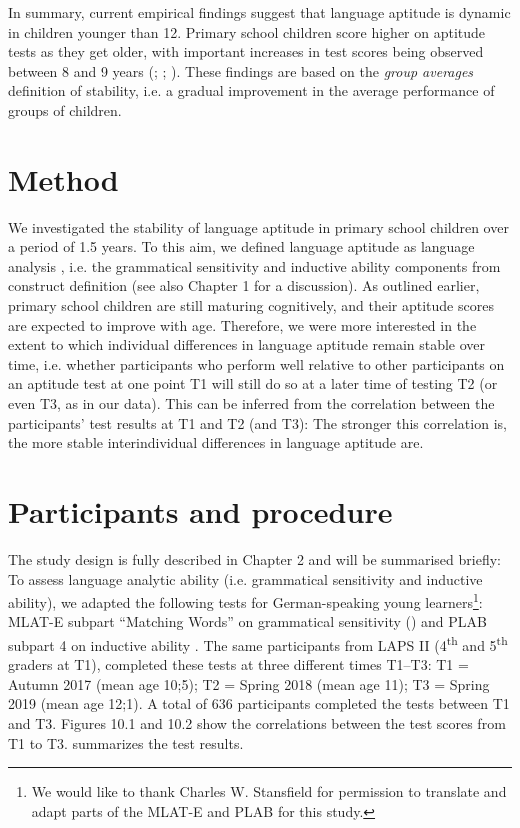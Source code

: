 \documentclass[output=paper]{langsci/langscibook}
\begin{document}
In summary, current empirical findings suggest that language aptitude is dynamic in children younger than 12. Primary school children score higher on aptitude tests as they get older, with important increases in test scores being observed between 8 and 9 years (\citealt{MiltonAlexiou2006}; \citealt{Kiss2009}; \citealt{SuarezMunoz2011}). These findings are based on the \textit{group averages} definition of stability, i.e. a gradual improvement in the average performance of groups of children. 

\section{Method}

We investigated the stability of language aptitude in primary school children over a period of 1.5 years. To this aim, we defined language aptitude as language analysis \citep{Skehan1998}, i.e. the grammatical sensitivity and inductive ability components from  construct definition (see also Chapter 1 for a discussion). As outlined earlier, primary school children are still maturing cognitively, and their aptitude scores are expected to improve with age. Therefore, we were more interested in the extent to which individual differences in language aptitude remain stable over time, i.e. whether participants who perform well relative to other participants on an aptitude test at one point T1 will still do so at a later time of testing T2 (or even T3, as in our data). This can be inferred from the correlation between the participants’ test results at T1 and T2 (and T3): The stronger this correlation is, the more stable interindividual differences in language aptitude are. 

 \section{Participants and procedure}


The study design is fully described in Chapter 2 and will be summarised briefly: To assess language analytic ability (i.e. grammatical sensitivity and inductive ability), we adapted the following tests for German-speaking young learners\footnote{We would like to thank Charles W. Stansfield for permission to translate and adapt parts of the MLAT-E and PLAB for this study.}: MLAT-E subpart “Matching Words” on grammatical sensitivity (\citealt{CarrollSapon1976}) and PLAB subpart 4 on inductive ability \citep{PimsleurEtAl2004}. The same participants from LAPS II (4\textsuperscript{th} and 5\textsuperscript{th} graders at T1), completed these tests at three different times T1--T3: T1 = Autumn 2017 (mean age 10;5); T2 = Spring 2018 (mean age 11); T3 = Spring 2019 (mean age 12;1). A total of 636 participants completed the tests between T1 and T3. Figures 10.1 and 10.2 show the correlations between the test scores from T1 to T3.  summarizes the test results. 
\end{document}
